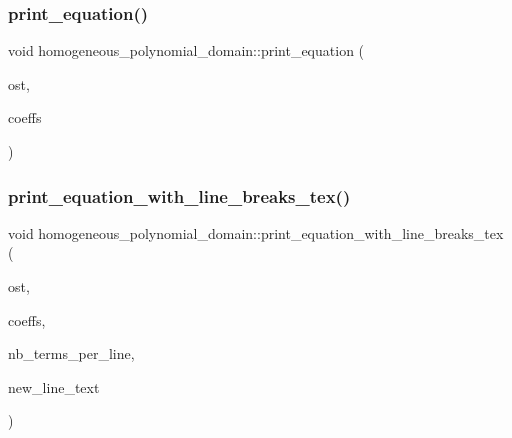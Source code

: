 \mbox{\label{classhomogeneous__polynomial__domain_a39fe7da58a442801d7c8be1121a57bfe}} 
\subsubsection{\texorpdfstring{print\+\_\+equation()}{print\_equation()}}
{\footnotesize\ttfamily void homogeneous\+\_\+polynomial\+\_\+domain\+::print\+\_\+equation (\begin{DoxyParamCaption}\item[{ostream \&}]{ost,  }\item[{\mbox{\hyperlink{galois_8h_a09fddde158a3a20bd2dcadb609de11dc}{I\+NT}} $\ast$}]{coeffs }\end{DoxyParamCaption})}

\mbox{\label{classhomogeneous__polynomial__domain_a380597c635c722d4577cabce701bf55f}} 
\subsubsection{\texorpdfstring{print\+\_\+equation\+\_\+with\+\_\+line\+\_\+breaks\+\_\+tex()}{print\_equation\_with\_line\_breaks\_tex()}}
{\footnotesize\ttfamily void homogeneous\+\_\+polynomial\+\_\+domain\+::print\+\_\+equation\+\_\+with\+\_\+line\+\_\+breaks\+\_\+tex (\begin{DoxyParamCaption}\item[{ostream \&}]{ost,  }\item[{\mbox{\hyperlink{galois_8h_a09fddde158a3a20bd2dcadb609de11dc}{I\+NT}} $\ast$}]{coeffs,  }\item[{\mbox{\hyperlink{galois_8h_a09fddde158a3a20bd2dcadb609de11dc}{I\+NT}}}]{nb\+\_\+terms\+\_\+per\+\_\+line,  }\item[{const \mbox{\hyperlink{galois_8h_ab6cc7b4aeb6ea31aba2b3fbfc83ff5e6}{B\+Y\+TE}} $\ast$}]{new\+\_\+line\+\_\+text }\end{DoxyParamCaption})}

